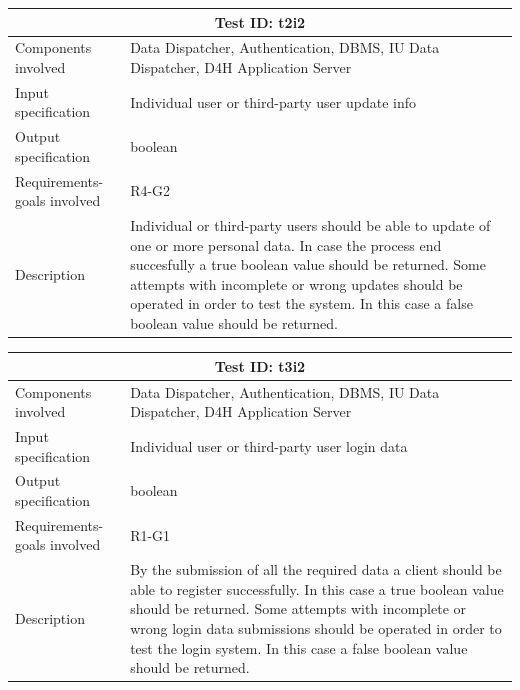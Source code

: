 \begin{table}[H]
\centering
\begin{tabular}{ |p{4.5cm}||p{11cm}|  }
 \hline
 \multicolumn{2}{|c|}{Test ID: t2i2} \\
 
 \hline 
 Components involved  	&   Data Dispatcher, Authentication, DBMS, IU Data Dispatcher, D4H Application Server \\
 Input specification  	&  	 Individual user or third-party user update info\\
Output specification  	& 	  boolean	\\
Requirements-goals involved &    R4-G2 \\
Description  	& 	 	    Individual or third-party users should be able to update of one or more personal data. In case the process end succesfully a true boolean value should be returned. Some attempts with incomplete or wrong updates should be operated in order to test the system. In this case a false boolean value should be returned.\\
 \hline
\end{tabular}
\end{table}
\begin{table}[H]
\centering
\begin{tabular}{ |p{4.5cm}||p{11cm}|  }
 \hline
 \multicolumn{2}{|c|}{Test ID: t3i2} \\
 
 \hline 
 Components involved  	&  Data Dispatcher, Authentication, DBMS, IU Data Dispatcher, D4H Application Server \\
 Input specification  	&  	 Individual user or third-party user login data\\
Output specification  	& 	  	boolean\\
Requirements-goals involved &    R1-G1\\
Description  	& 	 	 By the submission of all the required data a client should be able to register successfully. In this case a true boolean value should be returned. Some attempts with incomplete or wrong login data submissions should be operated in order to test the login system. In this case a false boolean value should be returned.   \\
 \hline
\end{tabular}
\end{table}

